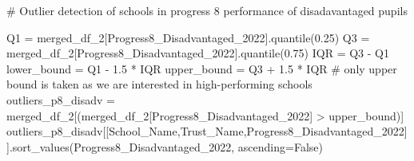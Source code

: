 \documentclass[
  letterpaper,
  DIV=11,
  numbers=noendperiod]{scrartcl}
\newenvironment{Shaded}{\begin{snugshade}}{\end{snugshade}}
\newcommand{\CommentTok}[1]{\textcolor[rgb]{0.37,0.37,0.37}{#1}}
\newcommand{\FloatTok}[1]{\textcolor[rgb]{0.68,0.00,0.00}{#1}}
\newcommand{\NormalTok}[1]{\textcolor[rgb]{0.00,0.23,0.31}{#1}}
\newcommand{\OperatorTok}[1]{\textcolor[rgb]{0.37,0.37,0.37}{#1}}
\newcommand{\StringTok}[1]{\textcolor[rgb]{0.13,0.47,0.30}{#1}}
\newcommand{\VariableTok}[1]{\textcolor[rgb]{0.07,0.07,0.07}{#1}}
\begin{document}
\begin{Shaded}
\begin{Highlighting}[]
\CommentTok{\#  Outlier detection of schools in progress 8 performance of disadavantaged pupils}

\NormalTok{Q1 }\OperatorTok{=}\NormalTok{ merged\_df\_2[}\StringTok{\textquotesingle{}Progress8\_Disadvantaged\_2022\textquotesingle{}}\NormalTok{].quantile(}\FloatTok{0.25}\NormalTok{)}
\NormalTok{Q3 }\OperatorTok{=}\NormalTok{ merged\_df\_2[}\StringTok{\textquotesingle{}Progress8\_Disadvantaged\_2022\textquotesingle{}}\NormalTok{].quantile(}\FloatTok{0.75}\NormalTok{)}
\NormalTok{IQR }\OperatorTok{=}\NormalTok{ Q3 }\OperatorTok{{-}}\NormalTok{ Q1}
\NormalTok{lower\_bound }\OperatorTok{=}\NormalTok{ Q1 }\OperatorTok{{-}} \FloatTok{1.5} \OperatorTok{*}\NormalTok{ IQR}
\NormalTok{upper\_bound }\OperatorTok{=}\NormalTok{ Q3 }\OperatorTok{+} \FloatTok{1.5} \OperatorTok{*}\NormalTok{ IQR}
 \CommentTok{\# only upper bound is taken as we are interested in high{-}performing schools}
\NormalTok{outliers\_p8\_disadv }\OperatorTok{=}\NormalTok{ merged\_df\_2[(merged\_df\_2[}\StringTok{\textquotesingle{}Progress8\_Disadvantaged\_2022\textquotesingle{}}\NormalTok{] }\OperatorTok{\textgreater{}}\NormalTok{ upper\_bound)]  }
\NormalTok{outliers\_p8\_disadv[[}\StringTok{\textquotesingle{}School\_Name\textquotesingle{}}\NormalTok{,}\StringTok{\textquotesingle{}Trust\_Name\textquotesingle{}}\NormalTok{,}\StringTok{\textquotesingle{}Progress8\_Disadvantaged\_2022\textquotesingle{}}\NormalTok{]].sort\_values(}\StringTok{\textquotesingle{}Progress8\_Disadvantaged\_2022\textquotesingle{}}\NormalTok{, ascending}\OperatorTok{=}\VariableTok{False}\NormalTok{)}
\end{Highlighting}
\end{Shaded}
\end{document}
